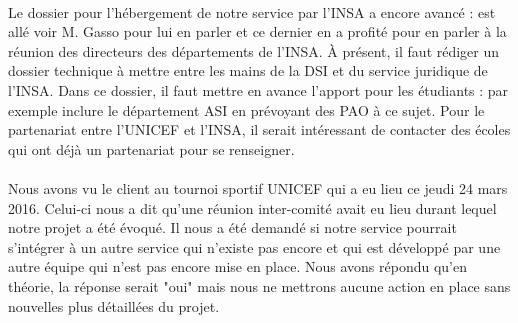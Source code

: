 \documentclass [a4paper] {article}
\begin{document}
\paragraph*{}
Le dossier pour l’hébergement de notre service par l'INSA a encore avancé : \Sergi est allé voir M. Gasso pour lui en parler et ce dernier en a profité pour en parler à la réunion des directeurs des départements de l'INSA. À présent, il faut rédiger un dossier technique à mettre entre les mains de la DSI et du service juridique de l'INSA. Dans ce dossier, il faut mettre en avance l'apport pour les étudiants : par exemple inclure le département ASI en prévoyant des PAO à ce sujet. Pour le partenariat entre l'UNICEF et l'INSA, il serait intéressant de contacter des écoles qui ont déjà un partenariat pour se renseigner.

\paragraph*{}
Nous avons vu le client au tournoi sportif UNICEF qui a eu lieu ce jeudi 24 mars 2016. Celui-ci nous a dit qu'une réunion inter-comité avait eu lieu durant lequel notre projet a été évoqué. Il nous a été demandé si notre service pourrait s'intégrer à un autre service qui n'existe pas encore et qui est développé par une autre équipe qui n'est pas encore mise en place. Nous avons répondu qu'en théorie, la réponse serait "oui" mais nous ne mettrons aucune action en place sans nouvelles plus détaillées du projet.

\newpage
\end{document}
